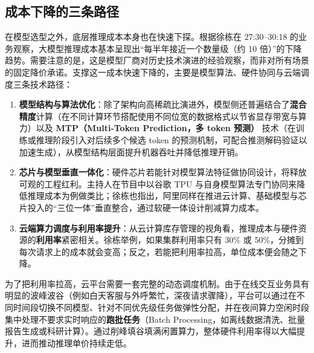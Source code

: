 \documentclass[UTF8,a4paper,11pt,fontset=fandol]{ctexart}
\begin{document}
\subsection{成本下降的三条路径}
在模型选型之外，底层推理成本本身也在快速下探。根据徐栋在 27:30–30:18 的业务观察，大模型推理成本基本呈现出“每半年接近一个数量级（约 10 倍）”的下降趋势。需要注意的是，这是模型厂商对历史技术演进的经验观察，而非对所有场景的固定降价承诺。支撑这一成本快速下降的，主要是模型算法、硬件协同与云端调度三条技术路径：

\begin{enumerate}
\item \textbf{模型结构与算法优化}：除了架构向高稀疏比演进外，模型侧还普遍结合了\textbf{混合精度}计算（在不同计算环节搭配使用不同位宽的数据格式以节省显存带宽与算力）以及 \textbf{MTP（Multi-Token Prediction，多 token 预测）} 技术（在训练或推理阶段引入对后续多个候选 token 的预测机制，可配合推测解码验证以加速生成），从模型结构层面提升机器吞吐并降低推理开销。
\item \textbf{芯片与模型垂直一体化}：硬件芯片若能针对模型算法特征做协同设计，将释放可观的工程红利。主持人在节目中以谷歌 TPU 与自身模型算法专门协同来降低推理成本为例做类比；徐栋也指出，阿里同样在推进云计算、基础模型与芯片投入的“三位一体”垂直整合，通过软硬一体设计削减算力成本。
\item \textbf{云端算力调度与利用率提升}：从云计算库存管理的视角看，推理成本与硬件资源的\textbf{利用率}紧密相关。徐栋举例，如果集群利用率只有 30\% 或 50\%，分摊到每次请求上的成本就会变高；反之，若能把利用率拉高，单位成本便会随之下降。
\end{enumerate}

为了把利用率拉高，云平台需要一套完整的动态调度机制。由于在线交互业务具有明显的波峰波谷（例如白天客服与外呼繁忙，深夜请求骤降），平台可以通过在不同时间段切换不同模型、针对不同优先级任务做弹性分配，并在夜间算力空闲时段集中处理不要求实时响应的\textbf{跑批任务}（Batch Processing，如离线数据清洗、批量报告生成或科研计算）。通过削峰填谷填满闲置算力，整体硬件利用率得以大幅提升，进而推动推理单价持续走低。
\end{document}
